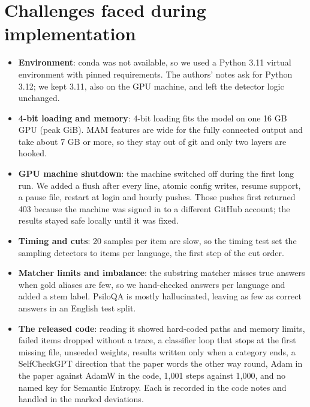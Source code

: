 \documentclass[12pt]{article}
\begin{document}
\section{Challenges faced during implementation}
\begin{itemize}
\item \textbf{Environment}: conda was not available, so we used a Python 3.11 virtual environment with pinned requirements. The authors' notes ask for Python 3.12; we kept 3.11, also on the GPU machine, and left the detector logic unchanged.
\item \textbf{4-bit loading and memory}: 4-bit loading fits the model on one 16 GB GPU (peak \peakvram{} GiB). MAM features are \fcwidth{} wide for the fully connected output and take about 7 GB or more, so they stay out of git and only two layers are hooked.
\item \textbf{GPU machine shutdown}: the machine switched off during the first long run. We added a flush after every line, atomic config writes, resume support, a pause file, restart at login and hourly pushes. Those pushes first returned 403 because the machine was signed in to a different GitHub account; the results stayed safe locally until it was fixed.
\item \textbf{Timing and cuts}: 20 samples per item are slow, so the timing test set the sampling detectors to \samplingn{} items per language, the first step of the cut order.
\item \textbf{Matcher limits and imbalance}: the substring matcher misses true answers when gold aliases are few, so we hand-checked \hcper{} answers per language and added a stem label. PsiloQA is mostly hallucinated, leaving as few as \psenminority{} correct answers in an English test split.
\item \textbf{The released code}: reading it showed hard-coded paths and memory limits, failed items dropped without a trace, a classifier loop that stops at the first missing file, unseeded weights, results written only when a category ends, a SelfCheckGPT direction that the paper words the other way round, Adam in the paper against AdamW in the code, 1,001 steps against 1,000, and no named key for Semantic Entropy. Each is recorded in the code notes and handled in the marked deviations.
\end{itemize}
\end{document}
